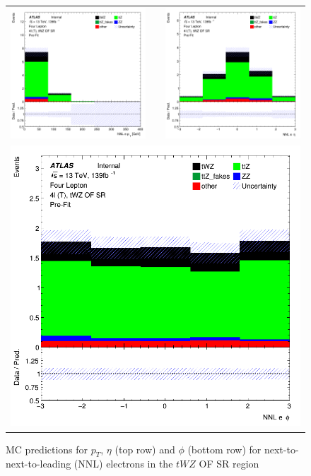 \clearpage

\begin{figure}[htbp]
\centering
  \begin{tabular}{ccc}

    \includegraphics[width=.2\textwidth]{figures/PreFitPlots/lep4_tWZ_4T_OF_NNL_el_pt} & &
    \includegraphics[width=.2\textwidth]{figures/PreFitPlots/lep4_tWZ_4T_OF_NNL_el_eta} \\
    \multicolumn{3}{c}{\includegraphics[width=.2\textwidth]{figures/PreFitPlots/lep4_tWZ_4T_OF_NNL_el_phi}}
  \end{tabular}
    \caption{MC predictions for $p_{T}$, $\eta$ (top row) and $\phi$ (bottom row) for next-to-next-to-leading (NNL) electrons in the $tWZ$ OF SR region}
  \label{fig:4lep-OF-SR-electronPlots}
\end{figure}


